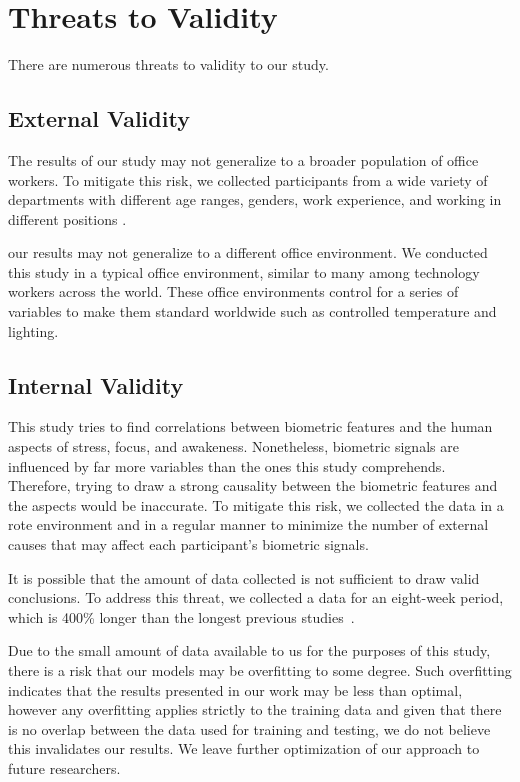 \section{Threats to Validity}
There are numerous threats to validity to our study.

\subsection{External Validity}
The results of our study may 
 not generalize to a broader population of office workers.
To mitigate this risk, we collected participants
from a wide variety of departments
with different age ranges, genders, work experience, and 
working in different positions .

 our results may not generalize
to a different office environment. We conducted
this study in a typical office environment, similar to many
among technology workers across the world.
These office environments control for a series of
variables to make them standard worldwide such
as controlled temperature and lighting.

\subsection{Internal Validity}
This study tries to find correlations between
biometric features and the human aspects of stress, focus, and awakeness.
Nonetheless, biometric signals are influenced by far more
variables than the ones this study comprehends.
Therefore, trying to draw a strong causality between the biometric
features and the aspects would be inaccurate.
To mitigate this risk,  we collected the data
in a rote environment and in a regular manner 
to minimize the number of 
external causes that may affect each participant's
biometric signals.

It is possible that the amount of data collected
is not sufficient
to draw valid conclusions. To address this threat, 
we collected a data for an eight-week period, which is
400\% longer than the longest previous studies~\cite{zuger18,Muller16}.

Due to the small amount of data available to us for the purposes of this study, there is a risk
that our models may be overfitting to some degree. Such overfitting indicates that the results presented in our work may be less than optimal, however any overfitting applies strictly to the training data and given that there is no overlap between the data used for training and testing, we do not believe this invalidates our results.
We leave further optimization of our approach to future researchers.


